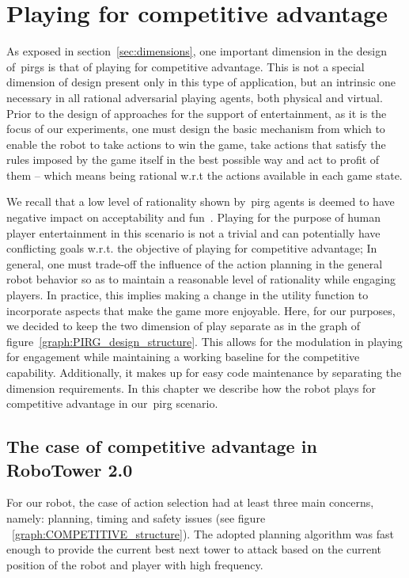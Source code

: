 \chapter{Playing for competitive advantage}\label{ch:playing_for_advantage}

As exposed in section~\ref{sec:dimensions}, one important dimension in the design of~\gls{pirg}s is that of playing for competitive advantage. This is not a special dimension of design present only in this type of application, but an intrinsic one necessary in all rational adversarial playing agents, both physical and virtual. Prior to the design of approaches for the support of entertainment, as it is the focus of our experiments, one must design the basic mechanism from which to enable the robot to take actions to win the game, \ie take actions that satisfy the rules imposed by the game itself in the best possible way and act to profit of them -- which means being rational w.r.t the actions available in each game state. 

We recall that a low level of rationality shown by~\gls{pirg} agents is deemed to have negative impact on acceptability and fun~\citep{martinoia_physically_2013}. Playing for the purpose of human player entertainment in this scenario is not a trivial and can potentially have conflicting goals w.r.t. the objective of playing for competitive advantage; In general, one must trade-off the influence of the action planning in the general robot behavior so as to maintain a reasonable level of rationality while engaging players. In practice, this implies making a change in the utility function to incorporate aspects that make the game more enjoyable. Here, for our purposes, we decided to keep the two dimension of play separate as in the graph of figure~\ref{graph:PIRG_design_structure}. This allows for the modulation in playing for engagement while maintaining a working baseline for the competitive capability. Additionally, it makes up for easy code maintenance by separating the dimension requirements.  In this chapter we describe how the robot plays for competitive advantage in our~\gls{pirg} scenario.

\section{The case of competitive advantage in RoboTower 2.0}

For our robot, the case of action selection had at least three main concerns, namely: planning, timing and safety issues (see figure ~\ref{graph:COMPETITIVE_structure}). The adopted planning algorithm was fast enough to provide the current best next tower to attack based on the current position of the robot and player with high frequency.


